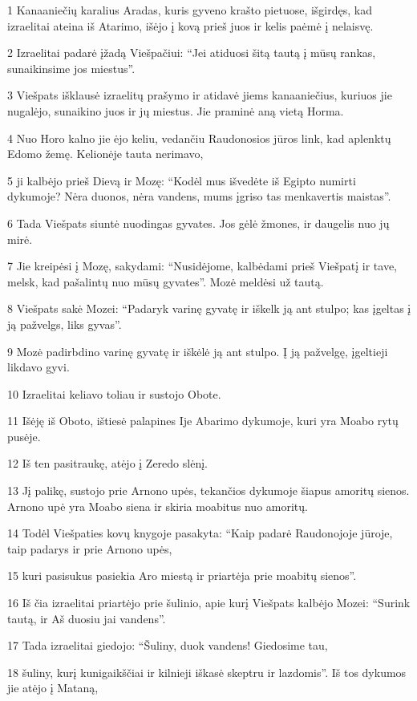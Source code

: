 \par 1 Kanaaniečių karalius Aradas, kuris gyveno krašto pietuose, išgirdęs, kad izraelitai ateina iš Atarimo, išėjo į kovą prieš juos ir kelis paėmė į nelaisvę. 
\par 2 Izraelitai padarė įžadą Viešpačiui: “Jei atiduosi šitą tautą į mūsų rankas, sunaikinsime jos miestus”. 
\par 3 Viešpats išklausė izraelitų prašymo ir atidavė jiems kanaaniečius, kuriuos jie nugalėjo, sunaikino juos ir jų miestus. Jie praminė aną vietą Horma. 
\par 4 Nuo Horo kalno jie ėjo keliu, vedančiu Raudonosios jūros link, kad aplenktų Edomo žemę. Kelionėje tauta nerimavo, 
\par 5 ji kalbėjo prieš Dievą ir Mozę: “Kodėl mus išvedėte iš Egipto numirti dykumoje? Nėra duonos, nėra vandens, mums įgriso tas menkavertis maistas”. 
\par 6 Tada Viešpats siuntė nuodingas gyvates. Jos gėlė žmones, ir daugelis nuo jų mirė. 
\par 7 Jie kreipėsi į Mozę, sakydami: “Nusidėjome, kalbėdami prieš Viešpatį ir tave, melsk, kad pašalintų nuo mūsų gyvates”. Mozė meldėsi už tautą. 
\par 8 Viešpats sakė Mozei: “Padaryk varinę gyvatę ir iškelk ją ant stulpo; kas įgeltas į ją pažvelgs, liks gyvas”. 
\par 9 Mozė padirbdino varinę gyvatę ir iškėlė ją ant stulpo. Į ją pažvelgę, įgeltieji likdavo gyvi. 
\par 10 Izraelitai keliavo toliau ir sustojo Obote. 
\par 11 Išėję iš Oboto, ištiesė palapines Ije Abarimo dykumoje, kuri yra Moabo rytų pusėje. 
\par 12 Iš ten pasitraukę, atėjo į Zeredo slėnį. 
\par 13 Jį palikę, sustojo prie Arnono upės, tekančios dykumoje šiapus amoritų sienos. Arnono upė yra Moabo siena ir skiria moabitus nuo amoritų. 
\par 14 Todėl Viešpaties kovų knygoje pasakyta: “Kaip padarė Raudonojoje jūroje, taip padarys ir prie Arnono upės, 
\par 15 kuri pasisukus pasiekia Aro miestą ir priartėja prie moabitų sienos”. 
\par 16 Iš čia izraelitai priartėjo prie šulinio, apie kurį Viešpats kalbėjo Mozei: “Surink tautą, ir Aš duosiu jai vandens”. 
\par 17 Tada izraelitai giedojo: “Šuliny, duok vandens! Giedosime tau, 
\par 18 šuliny, kurį kunigaikščiai ir kilnieji iškasė skeptru ir lazdomis”. Iš tos dykumos jie atėjo į Mataną, 

